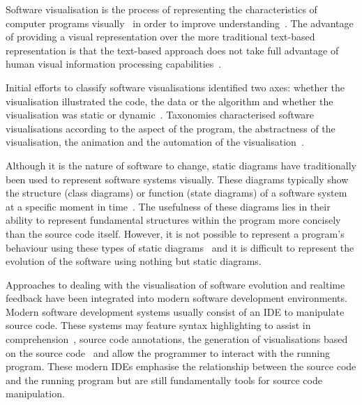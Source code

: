 Software visualisation is the process of representing the characteristics of computer programs visually~\cite{Stasko1992} in order to improve understanding~\cite{Diehl2007}. The advantage of providing a visual representation over the more traditional text-based representation is that the text-based approach does not take full advantage of human visual information processing capabilities~\cite{Myers1989}.

Initial efforts to classify software visualisations identified two axes: whether the visualisation illustrated the code, the data or the algorithm and whether the visualisation was static or dynamic~\cite{Myers1989}. Taxonomies characterised software visualisations according to the aspect of the program, the abstractness of the visualisation, the animation and the automation of the visualisation~\cite{Stasko1992}.

Although it is the nature of software to change, static diagrams have traditionally been used to represent software systems visually. These diagrams typically show the structure (class diagrams) or function (state diagrams) of a software system at a specific moment in time~\cite{Rumbaugh2004}. The usefulness of these diagrams lies in their ability to represent fundamental structures within the program more concisely than the source code itself. However, it is not possible to represent a program's behaviour using these types of static diagrams~\cite{Baecker1998} and it is difficult to represent the evolution of the software using nothing but static diagrams.


Approaches to dealing with the visualisation of software evolution and realtime feedback have been integrated into modern software development environments. Modern software development systems usually consist of an \ac{IDE} to manipulate source code. These systems may feature syntax highlighting to assist in comprehension~\cite{Chen2005,Reis}, source code annotations, the generation of visualisations based on the source code~\cite{Hendrix2004} and allow the programmer to interact with the running program. These modern \acp{IDE} emphasise the relationship between the source code and the running program but are still fundamentally tools for source code manipulation. 

